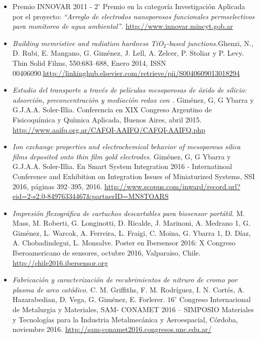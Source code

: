   \begin{itemize}[leftmargin=0cm,label={}]
  	
  	\item Premio INNOVAR 2011 - $2^\circ$ Premio en la categoría Investigación Aplicada por el proyecto: \textit{``Arreglo de electrodos nanoporosos funcionales permselectivos para monitoreo de agua ambiental''}. \url{http://www.innovar.mincyt.gob.ar}
   
    \item \textit{Building memristive and radiation hardness TiO$_2$-based junctions.}\linebreak Ghenzi, N., D. Rubi, E. Mangano, G. Giménez, J. Lell, A. Zelcer, P. Stoliar y P. Levy. Thin Solid Films, 550:683–688, Enero 2014, ISSN 00406090.\url{http://linkinghub.elsevier.com/retrieve/pii/S0040609013018294}

    \item \textit{Estudio del transporte a través de películas mesoporosas de óxido de silicio: adsorción, preconcentración y mediación redox con \aminorutenioCompleto.} Giménez, G, G Ybarra y G.J.A.A. Soler-Illia. Conferencia en XIX Congreso Argentino de Fisicoquímica y Química Aplicada, Buenos Aires, abril 2015. \url{http://www.aaifq.org.ar/CAFQI-AAIFQ/CAFQI-AAIFQ.php}
    
    \item \textit{Ion exchange properties and electrochemical behavior of mesoporous silica films deposited onto thin film gold electrodes.} Giménez, G, G Ybarra y G.J.A.A. Soler-Illia. En Smart System Integration 2016 - Internatinoal Conference and
    Exhibition on Integration Issues of Miniaturized Systems, SSI 2016, páginas 392–395, 2016. \url{http://www.scopus.com/inward/record.url?eid=2-s2.0-84976334467&partnerID=MN8TOARS}
    
    \item \textit{Impresión\hspace*{-0.5pt} flexográfica de cartuchos\hspace*{-0.5pt} descartables\hspace*{-0.5pt} para biosensor\hspace*{-0.5pt} portátil.} M. Mass, M. Roberti, G. Longinotti, D. Ricalde, J. Marinoni, A. Medrano 1, G. Giménez, L. Warcok, A. Ferreira, L. Fraigi, C. Moina, G. Ybarra 1, D. Díaz, A. Chobadindegui, L. Monsalve. Poster en Ibersensor 2016: X Congreso Iberoamericano de sensores, octubre 2016, Valparaiso,  Chile. \url{http://chile2016.ibersensor.org}
    
    \item \textit{Fabricación y caracterización de recubrimientos de nitruro de cromo por plasma de arco catódico.} C. M. Griffiths, F. M. Rodríguez, I. N. Cortés, A. Hazarabedian, D. Vega, G. Giménez, E. Forlerer. $16^\circ$ Congreso Internacional de Metalurgia y Materiales, SAM-
CONAMET 2016 – SIMPOSIO Materiales y Tecnologías para la Industria Metalmecánica y Aeroespacial, Córdoba, noviembre 2016. \url{http://sam-conamet2016.congresos.unc.edu.ar/}


\end{itemize}
